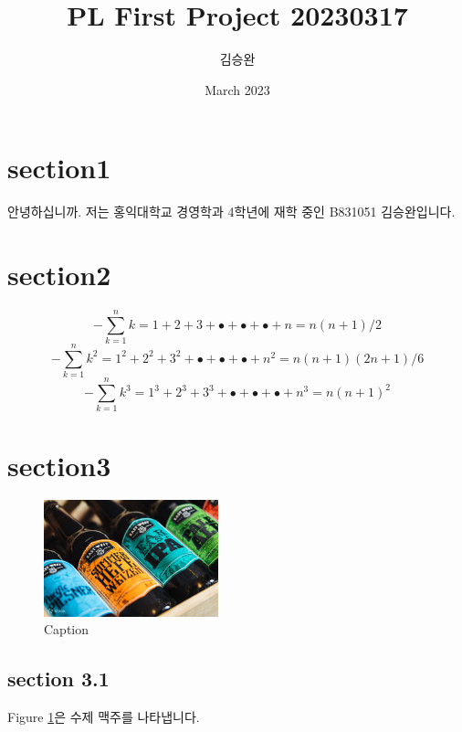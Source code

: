 \documentclass{article}
\title{PL First Project 20230317}
\author{김승완}
\date{March 2023}
\begin{document}
\maketitle

\section{section1}
안녕하십니까. 저는 홍익대학교 경영학과 4학년에 재학 중인 B831051 김승완입니다. 
\section{section2}
\begin{displaymath}
    -\sum^n_{k=1}k=1+2+3+ \bullet+ \bullet+ \bullet +n=n(n+1)/2
\end{displaymath}
\begin{displaymath}
    -\sum^n_{k=1}k^2=1^2+2^2+3^2+ \bullet + \bullet +\bullet +n^2=n(n+1)(2n+1)/6
\end{displaymath}
\begin{displaymath}
    -\sum^n_{k=1}k^3=1^3+2^3+3^3+ \bullet + \bullet +\bullet + n^3= {n(n+1)}^2
\end{displaymath}
\section{section3}
\begin{figure}
    \centering
    \includegraphics[width=0.45\textwidth]{craftbeer2.jpg}
    \caption{Caption}
    \label{fig:figbeer}
\end{figure}
\subsection{section 3.1}
        Figure \ref{fig:figbeer}은 수제 맥주를 나타냅니다.
\end{document}
